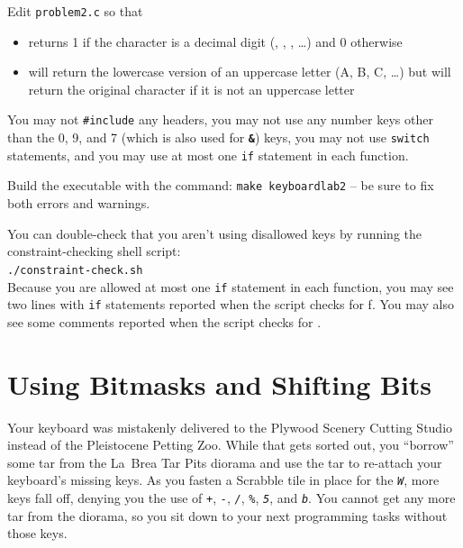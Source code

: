 Edit \texttt{problem2.c} so that
\begin{itemize}
\item {} returns 1 if the character is a decimal digit
    (\textquotesingle, \textquotesingle,
    \textquotesingle, \dots) and 0 otherwise
\item {} will return the lowercase version of an
    uppercase letter (\textquotesingle A\textquotesingle, \textquotesingle
    B\textquotesingle, \textquotesingle C\textquotesingle, \dots) but will
    return the original character if it is not an uppercase letter
\end{itemize}
You may not \lstinline{#include} any headers, you may not use any number keys
other than the 0, 9, and 7 (which is also used for \textbf{\texttt{\&}}) keys,
you may not use \lstinline{switch} statements, and you may use at most one
\lstinline{if} statement in each function.

Build the executable with the command: \texttt{make keyboardlab2} -- be sure to
fix both errors and warnings.

You can double-check that you aren't using disallowed keys by running the
constraint-checking shell script: \\
\texttt{./constraint-check.sh} \\
Because you are allowed at most one \lstinline{if} statement in each function,
you may see two lines with \lstinline{if} statements reported when the script
checks for \textquotesingle f\textquotesingle. You may also see some comments
reported when the script checks for \textquotesingle *\textquotesingle.


\section{Using Bitmasks and Shifting Bits}

Your keyboard was mistakenly delivered to the Plywood Scenery Cutting Studio
instead of the Pleistocene Petting Zoo. While that gets sorted out, you
``borrow'' some tar from the La~Brea Tar Pits diorama and use the tar to
re-attach your keyboard's missing keys. As you fasten a Scrabble tile in place
for the \textit{\texttt{W}}, more keys fall off, denying you the use of
\textit{\texttt{+}}, \textit{\texttt{-}}, \textit{\texttt{/}},
\textit{\texttt{\%}}, \textit{\texttt{5}}, and \textit{\texttt{b}}. You cannot
get any more tar from the diorama, so you sit down to your next programming
tasks without those keys.

